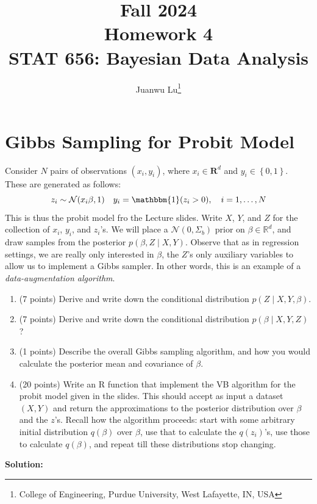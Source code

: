 \documentclass[
]{article}
\title{\textbf{Fall 2024}\\
\textbf{Homework 4}\\
\textbf{STAT 656: Bayesian Data Analysis}}
\author{Juanwu Lu\footnote{College of Engineering, Purdue University,
  West Lafayette, IN, USA}}
\date{}
\providecommand{\tightlist}{%
  \setlength{\itemsep}{0pt}\setlength{\parskip}{0pt}}
\begin{document}
\maketitle

\section{Gibbs Sampling for Probit
Model}\label{gibbs-sampling-for-probit-model}

Consider \(N\) pairs of observations \((x_{i},y_{i})\), where
\(x_{i}\in\mathbf{R}^{d}\) and \(y_{i}\in\left\{0, 1\right\}\). These
are generated as follows: \[
z_{i}\sim\mathcal{N}(x_{i}\beta,1)\quad y_{i}=\mathbbm{1}(z_{i}> 0),\quad i=1,\ldots,N 
\] This is thus the probit model fro the Lecture slides. Write \(X\),
\(Y\), and \(Z\) for the collection of \(x_{i}\), \(y_{i}\), and
\(z_{i}\)'s. We will place a \(\mathcal{N}(0,\Sigma_{b})\) prior on
\(\beta\in\mathbb{R}^{d}\), and draw samples from the posterior
\(p(\beta,Z\mid X,Y)\). Observe that as in regression settings, we are
really only interested in \(\beta\), the \(Z\)'s only auxiliary
variables to allow us to implement a Gibbs sampler. In other words, this
is an example of a \emph{data-augmentation algorithm}.

\begin{enumerate}
\def\labelenumi{\arabic{enumi}.}
\tightlist
\item
  (7 points) Derive and write down the conditional distribution
  \(p(Z\mid X,Y,\beta)\).
\item
  (7 points) Derive and write down the conditional distribution
  \(p(\beta\mid X,Y,Z)\)?
\item
  (1 points) Describe the overall Gibbs sampling algorithm, and how you
  would calculate the posterior mean and covariance of \(\beta\).
\item
  (20 points) Write an R function that implement the VB algorithm for
  the probit model given in the slides. This should accept as input a
  dataset \((X, Y)\) and return the approximations to the posterior
  distribution over \(\beta\) and the \(z\)'s. Recall how the algorithm
  proceeds: start with some arbitrary initial distribution \(q(\beta)\)
  over \(\beta\), use that to calculate the \(q(z_{i})\)'s, use those to
  calculate \(q(\beta)\), and repeat till these distributions stop
  changing.
\end{enumerate}

\textbf{Solution:}
\end{document}
